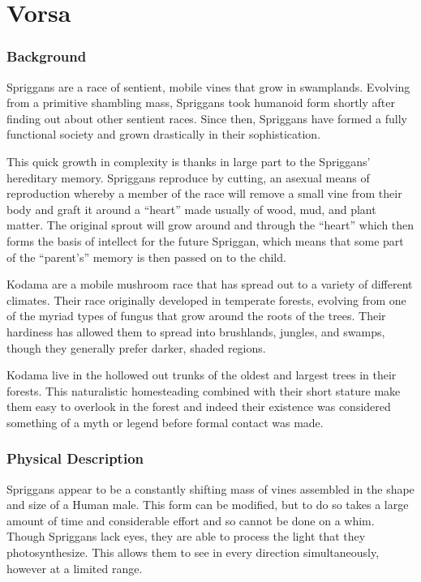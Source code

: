 \chapter*{Vorsa}

\subsection*{Background}

Spriggans are a race of sentient, mobile vines that grow in swamplands. Evolving from a primitive shambling mass, Spriggans took humanoid form shortly after finding out about other sentient races. Since then, Spriggans have formed a fully functional society and grown drastically in their sophistication.

This quick growth in complexity is thanks in large part to the Spriggans’ hereditary memory. Spriggans reproduce by cutting, an asexual means of reproduction whereby a member of the race will remove a small vine from their body and graft it around a “heart” made usually of wood, mud, and plant matter. The original sprout will grow around and through the “heart” which then forms the basis of intellect for the future Spriggan, which means that some part of the “parent’s” memory is then passed on to the child. 

Kodama are a mobile mushroom race that has spread out to a variety of different climates. Their race originally developed in temperate forests, evolving from one of the myriad types of fungus that grow around the roots of the trees. Their hardiness has allowed them to spread into brushlands, jungles,  and swamps, though they generally prefer darker, shaded regions.

Kodama live in the hollowed out trunks of the oldest and largest trees in their forests. This naturalistic homesteading combined with their short stature make them easy to overlook in the forest and indeed their existence was considered something of a myth or legend before formal contact was made.

\subsection*{Physical Description}

Spriggans appear to be a constantly shifting mass of vines assembled in the shape and size of a Human male. This form can be modified, but to do so takes a large amount of time and considerable effort and so cannot be done on a whim. Though Spriggans lack eyes, they are able to process the light that they photosynthesize. This allows them to see in every direction simultaneously, however at a limited range.

